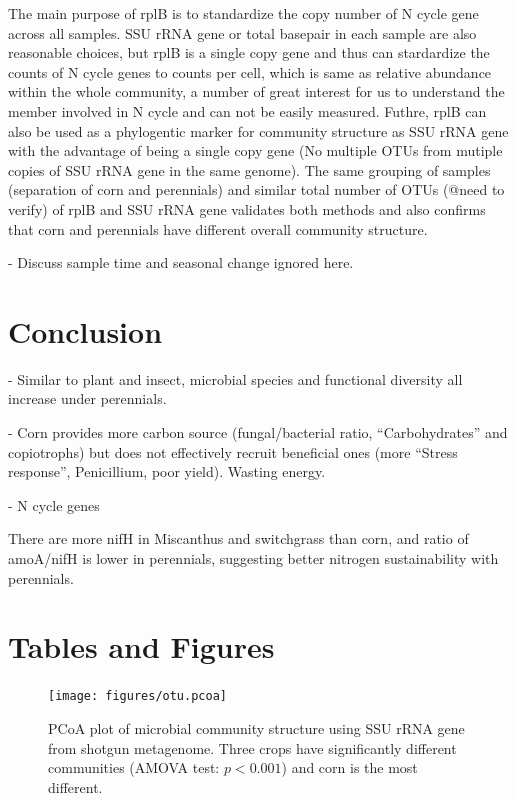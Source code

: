 \documentclass[12pt]{article}
\begin{document}
{The main purpose of rplB is to standardize the copy number of N cycle gene across all samples. SSU rRNA gene or total basepair in each sample are also reasonable choices, but rplB is a single copy gene and thus can stardardize the counts of N cycle genes to counts per cell, which is same as relative abundance within the whole community, a number of great interest for us to understand the member involved in N cycle and can not be easily measured. Futhre, rplB can also be used as a phylogentic marker for community structure as SSU rRNA gene with the advantage of being a single copy gene (No multiple OTUs from mutiple copies of SSU rRNA gene in the same genome). The same grouping of samples (separation of corn and perennials) and similar total number of OTUs (@need to verify) of rplB and SSU rRNA gene validates both methods and also confirms that corn and perennials have different overall community structure.

- Discuss sample time and seasonal change ignored here. 

\section{Conclusion}

- Similar to plant and insect, microbial species and functional diversity all increase under perennials.

- Corn provides more carbon source (fungal/bacterial ratio, ``Carbohydrates'' and copiotrophs) but does not effectively recruit beneficial ones (more ``Stress response'', Penicillium, poor yield). Wasting energy.

- N cycle genes

There are more nifH in Miscanthus and switchgrass than corn, and ratio of amoA/nifH is lower in perennials, suggesting better nitrogen sustainability with perennials.

\section{Tables and Figures}

    \begin{figure}[tbph!]
    \centering
    \texttt{[image: figures/otu.pcoa]}
    \caption[PCoA plot of microbial community structure using SSU rRNA gene]{PCoA plot of microbial community structure using SSU rRNA gene from shotgun metagenome. Three crops have significantly different communities (AMOVA test: $p < 0.001$) and corn is the most different.}
    \label{fig:otu.pcoa}
    \end{figure}


}
\end{document}
